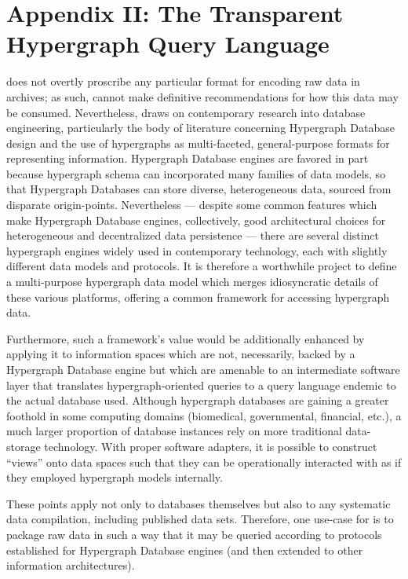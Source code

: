 \documentclass[11pt,letterpaper]{article}
\newcommand{\ATexttclr}[1]{\textcolor{tcolor}{\textbf{#1}}}
\newcommand{\lSDRF}{\resizebox{!}{8pt}{\ATexttclr{S}}\resizebox{!}{8pt}{\ATexttclr{DR%
\hspace{1pt}{\raisebox{-.5pt}{\fontfamily{qhv}\fontseries{b}\selectfont{}\Large{F}}%
}}}}
\newcommand{\SDRF}{\resizebox{!}{8pt}{\ATexttclr{S}}\resizebox{!}{8pt}{\ATexttclr{DR%
\hspace{1pt}{\raisebox{-1pt}{\fontfamily{qhv}\fontseries{b}\selectfont{}\Large{F}}%
}}}}
\newcommand{\p}[1]{

\vspace{.7em}#1}
\newcommand{\q}[1]{{\fontfamily{qcr}\selectfont ``}#1{\fontfamily{qcr}\selectfont ''}}
\begin{document}
{\section{Appendix II: The Transparent Hypergraph Query Language}
\p{\lSDRF{} does not overtly proscribe any particular 
format for encoding raw data in \SDRF{} archives; 
as such, \SDRF{} cannot make definitive recommendations 
for how this data may be consumed.  Nevertheless, 
\SDRF{} draws on contemporary research into database 
engineering, particularly the body of literature 
concerning Hypergraph Database design and the 
use of hypergraphs as multi-faceted, general-purpose 
formats for representing information.  Hypergraph 
Database engines are favored in part because hypergraph 
schema can incorporated many families of data models, 
so that Hypergraph Databases can store diverse, heterogeneous 
data, sourced from disparate origin-points.  
Nevertheless --- despite some common features which make Hypergraph Database 
engines, collectively, good architectural choices 
for heterogeneous and decentralized data persistence ---  
there are several distinct hypergraph engines 
widely used in contemporary technology, each with slightly 
different data models and protocols.  It is therefore a 
worthwhile project to define a multi-purpose hypergraph data 
model which merges idiosyncratic details of 
these various platforms, offering a common framework for 
accessing hypergraph data.}

\p{Furthermore, such a framework's value would 
be additionally enhanced by applying it to information spaces which 
are not, necessarily, backed by a Hypergraph Database engine 
but which are amenable to an intermediate software layer that 
translates hypergraph-oriented queries to a query language 
endemic to the actual database used.  Although hypergraph databases 
are gaining a greater foothold in some computing domains 
(biomedical, governmental, financial, etc.), a much larger 
proportion of database instances rely on more traditional 
data-storage technology.   With proper software 
adapters, it is possible to construct \q{views} onto 
data spaces such that they can be operationally interacted 
with as if they employed hypergraph models internally.}

\p{These points apply not only to databases themselves 
but also to any systematic data compilation, including 
published data sets.  Therefore, one use-case for 
\SDRF{} is to package raw data in such a way that 
it may be queried according to protocols established 
for Hypergraph Database engines (and then extended 
to other information architectures).}

}
\end{document}
